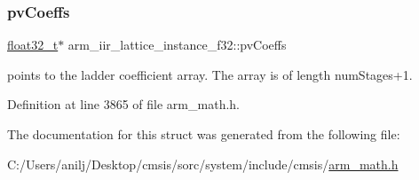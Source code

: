 \mbox{\label{structarm__iir__lattice__instance__f32_afc7c8f577e6f27d097fe55f57e707f72}} 
\subsubsection{\texorpdfstring{pv\+Coeffs}{pvCoeffs}}
{\footnotesize\ttfamily \hyperlink{arm__math_8h_a4611b605e45ab401f02cab15c5e38715}{float32\+\_\+t}$\ast$ arm\+\_\+iir\+\_\+lattice\+\_\+instance\+\_\+f32\+::pv\+Coeffs}

points to the ladder coefficient array. The array is of length num\+Stages+1. 

Definition at line 3865 of file arm\+\_\+math.\+h.



The documentation for this struct was generated from the following file\+:\begin{DoxyCompactItemize}
\item 
C\+:/\+Users/anilj/\+Desktop/cmsis/sorc/system/include/cmsis/\hyperlink{arm__math_8h}{arm\+\_\+math.\+h}\end{DoxyCompactItemize}
